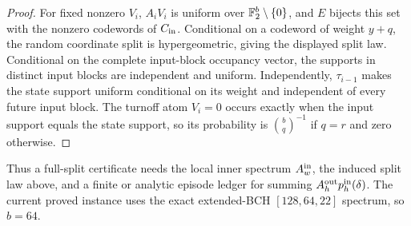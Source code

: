 \begin{proof}
For fixed nonzero \(V_i\), \(A_iV_i\) is uniform over
\(\mathbb{F}_2^b\setminus\{0\}\), and \(E\) bijects this set with the nonzero codewords
of \(C_{\rm in}\).  Conditional on a codeword of weight \(y+q\), the random
coordinate split is hypergeometric, giving the displayed split law.
Conditional on the complete input-block occupancy vector, the supports in
distinct input blocks are independent and uniform.  Independently,
\(\tau_{i-1}\) makes the state support uniform conditional on its weight and
independent of every future input block.  The turnoff atom \(V_i=0\) occurs
exactly when the input support equals the state support, so its probability is
\(\binom{b}{q}^{-1}\) if \(q=r\) and zero otherwise.
\end{proof}

Thus a full-split certificate needs the local inner spectrum \(A_w^{\rm in}\),
the induced split law above, and a finite or analytic episode ledger for
summing \(A_h^{\rm out}p_h^{\rm in}(\delta)\).  The current proved instance
uses the exact extended-BCH \([128,64,22]\) spectrum, so \(b=64\).
